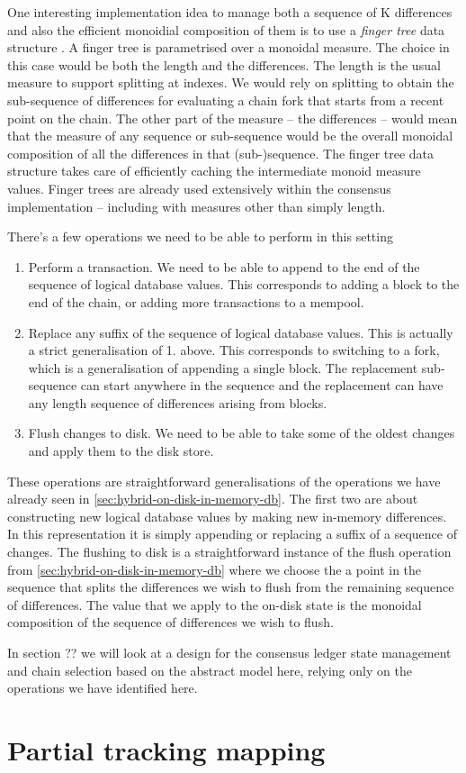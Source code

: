 \documentclass[11pt,a4paper]{article}
\begin{document}
One interesting implementation idea to manage both a sequence of K differences
and also the efficient monoidial composition of them is to use a \emph{finger
tree} data structure \citep{fingertree}. A finger tree is parametrised over a
monoidal measure. The choice in this case would be both the length and the
differences. The length is the usual measure to support splitting at indexes.
We would rely on splitting to obtain the sub-sequence of differences for
evaluating a chain fork that starts from a recent point on the chain. The other
part of the measure -- the differences -- would mean that the measure of any
sequence or sub-sequence would be the overall monoidal composition of all the
differences in that (sub-)sequence. The finger tree data structure takes care
of efficiently caching the intermediate monoid measure values. Finger trees are
already used extensively within the consensus implementation -- including with
measures other than simply length.

There's a few operations we need to be able to perform in this setting
\begin{enumerate}
\item Perform a transaction. We need to be able to append to the end of the
      sequence of logical database values. This corresponds to adding a block
      to the end of the chain, or adding more transactions to a mempool.
\item Replace any suffix of the sequence of logical database values. This is
      actually a strict generalisation of 1. above. This corresponds to
      switching to a fork, which is a generalisation of appending a single
      block. The replacement sub-sequence can start anywhere in the sequence and
      the replacement can have any length sequence of differences arising from
      blocks.
\item Flush changes to disk. We need to be able to take some of the oldest
      changes and apply them to the disk store.
\end{enumerate}
These operations are straightforward generalisations of the operations we have
already seen in \cref{sec:hybrid-on-disk-in-memory-db}. The first two are about
constructing new logical database values by making new in-memory differences.
In this representation it is simply appending or replacing a suffix of a
sequence of changes. The flushing to disk is a straightforward instance of the
flush operation from \cref{sec:hybrid-on-disk-in-memory-db} where we choose the
a point in the sequence that splits the differences we wish to flush from the
remaining sequence of differences. The value that we apply to the on-disk state
is the monoidal composition of the sequence of differences we wish to flush.

In section ?? we will look at a design for the consensus ledger state
management and chain selection based on the abstract model here, relying only
on the operations we have identified here.

\section{Partial tracking mapping}




\end{document}

